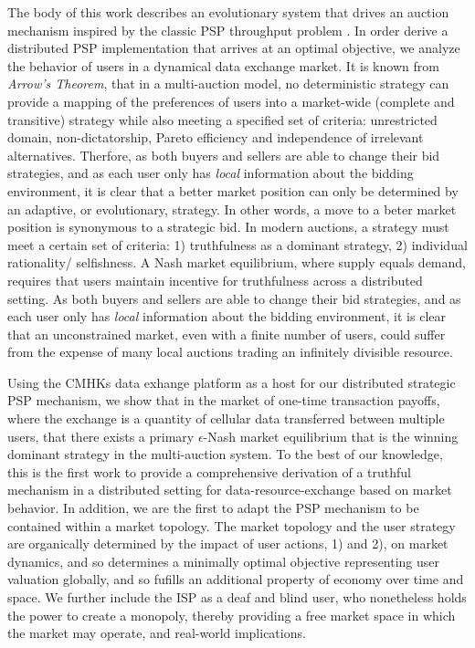 \documentclass[sigconf, anonymous]{acmart}
\theoremstyle{definition}
\begin{document}
The body of this work describes an evolutionary system that drives an auction
mechanism inspired by the classic PSP throughput problem \cite{lazar}. In
order derive a distributed PSP implementation that arrives at an optimal
objective,
we analyze the behavior of users in a dynamical data exchange market. 
It is known from \emph{Arrow's Theorem}, that in a multi-auction model, no deterministic strategy can
provide a mapping of the preferences of users into a market-wide (complete
and transitive) strategy while also meeting a specified set of criteria:
unrestricted domain, non-dictatorship, Pareto efficiency and independence of
irrelevant alternatives. 
Therfore, as both buyers and sellers are able
to change their bid strategies, and as each user only has \emph{local}
information about the bidding environment, it is clear that a better market
position can only be determined by an adaptive, or evolutionary, strategy.
In other words, a move to a beter market position is synonymous to a
strategic bid. In modern auctions, a strategy must meet a certain set of
criteria: 1) truthfulness as a dominant strategy, 2) individual rationality/
selfishness.  
A Nash market equilibrium, where
supply equals demand, requires that users maintain incentive for truthfulness
across a distributed setting.
As both buyers and sellers are able
to change their bid strategies, and as each user only has \emph{local}
information about the bidding environment, it is clear that an unconstrained
market, even with a finite number of users, could suffer from the
expense of many local auctions trading an infinitely divisible resource.

Using the CMHKs data exhange platform as a host for our distributed strategic
PSP mechanism, we show that in the market of one-time transaction payoffs,
where the exchange is a quantity of cellular data transferred between multiple
users, that there exists a primary $\epsilon$-Nash market equilibrium that is
the winning dominant strategy in the multi-auction system.
To the best of our knowledge, this is the first work to provide a comprehensive
derivation of a truthful mechanism in a distributed setting for
data-resource-exchange based on market behavior. In addition, we are the first
to adapt the PSP mechanism to be contained within a market topology. The market
topology and the user strategy are organically determined by the impact of user
actions, 1) and 2), on market dynamics, and so determines a minimally optimal objective
representing user valuation globally, and so fufills an additional property of
economy over time and space. We further include the ISP as a deaf and blind
user, who nonetheless holds the power to create a monopoly, thereby providing a free
market space in which the market may operate, and real-world implications.
\end{document}
